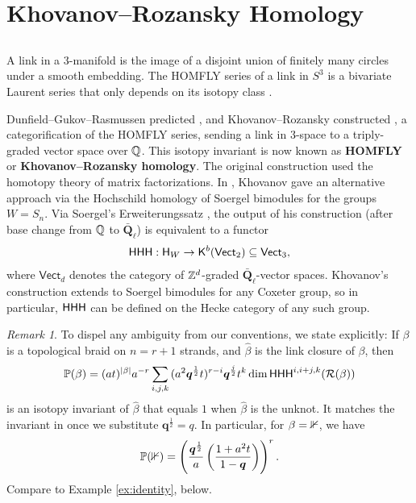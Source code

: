 \documentclass[a4paper,10pt,leqno]{amsart}
\theoremstyle{plain}
\theoremstyle{plain}
\theoremstyle{plain}
\theoremstyle{definition}
\theoremstyle{remark}
\newtheorem{rem}[thm]{Remark}
\newcommand{\dfemph}[1]{\textbf{#1}}
\newcommand{\Q}{\bm{q}}
\newcommand{\QL}{\bar{\mathbf{Q}}_\ell}
\newcommand{\Vect}{\mathsf{Vect}}
\begin{document}
\newpage
\section{Khovanov--Rozansky Homology}\label{sec:kr}

\subsection{}

A link in a $3$-manifold is the image of a disjoint union of finitely many circles under a smooth embedding.
The HOMFLY series of a link in $S^3$ is a bivariate Laurent series that only depends on its isotopy class \cite{homfly}.

Dunfield--Gukov--Rasmussen predicted \cite{dgr}, and Khovanov--Rozansky constructed \cite{kr}, a categorification of the HOMFLY series, sending a link in $3$-space to a triply-graded vector space over $\bb{Q}$.
This isotopy invariant is now known as \dfemph{HOMFLY} or \dfemph{Khovanov--Rozansky homology}.
The original construction used the homotopy theory of matrix factorizations.
In \cite{khovanov}, Khovanov gave an alternative approach via the Hochschild homology of Soergel bimodules for the groups $W = S_n$.
Via Soergel's Erweiterungssatz \cite[Thms.\ 15-17]{soergel}, the output of his construction (after base change from $\bb{Q}$ to $\QL$) is equivalent to a functor
\begin{align}
\sf{HHH} : \sf{H}_W \to \sf{K}^b(\Vect_2) \subseteq \Vect_3,
\end{align}
where $\Vect_d$ denotes the category of $\bb{Z}^d$-graded $\QL$-vector spaces.
Khovanov's construction extends to Soergel bimodules for any Coxeter group, so in particular, $\sf{HHH}$ can be defined on the Hecke category of any such group.

\begin{rem}\label{rem:dgr}
To dispel any ambiguity from our conventions, we state explicitly:
If $\beta$ is a topological braid on $n = r + 1$ strands, and $\hat{\beta}$ is the link closure of $\beta$, then
\begin{align}
\bb{P}(\beta) = {(at)^{|\beta|}} a^{-r} \sum_{i, j, k} 
{(a^2 \Q^{\frac{1}{2}} t)^{r - i}} \Q^{\frac{j}{2}} t^k
\dim \sf{HHH}^{i, i + j, k}(\cal{R}(\beta))
\end{align}
is an isotopy invariant of $\hat{\beta}$ that equals $1$ when $\hat{\beta}$ is the unknot.
It matches the invariant in \cite{dgr} once we substitute $\Q^{\frac{1}{2}} = q$.
In particular, for $\beta = \bb{1}$, we have
\begin{align}
\bb{P}(\bb{1}) = \pa{\frac{\Q^{\frac{1}{2}}}{a} \pa{\frac{1 + a^2 t}{1 - \Q}}}^r.
\end{align}
Compare to Example \ref{ex:identity}, below.
\end{rem}
\end{document}
